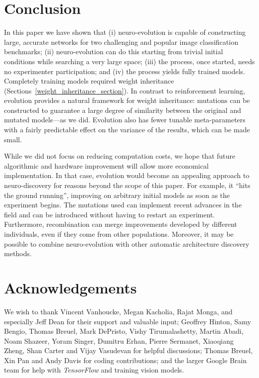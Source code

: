 \documentclass{article}
\begin{document}
\section{Conclusion}


In this paper we have shown that (i) neuro-evolution is capable of constructing large, accurate networks for two challenging and popular image classification benchmarks; (ii) neuro-evolution can do this starting from trivial initial conditions while searching a very large space; (iii) the process, once started, needs no experimenter participation; and (iv) the process yields fully trained models. Completely training models required weight inheritance (Sections~\ref{weight_inheritance_section}). In contrast to reinforcement learning, evolution provides a natural framework for weight inheritance: mutations can be constructed to guarantee a large degree of similarity between the original and mutated models---as we did. Evolution also has fewer tunable meta-parameters with a fairly predictable effect on the variance of the results, which can be made small.

While we did not focus on reducing computation costs, we hope that future algorithmic and hardware improvement will allow more economical implementation. In that case, evolution would become an appealing approach to neuro-discovery for reasons beyond the scope of this paper. For example, it ``hits the ground running'', improving on arbitrary initial models as soon as the experiment begins. The mutations used can implement recent advances in the field and can be introduced without having to restart an experiment. Furthermore, recombination can merge improvements developed by different individuals, even if they come from other populations. Moreover, it may be possible to combine neuro-evolution with other automatic architecture discovery methods.


\FloatBarrier

\section*{Acknowledgements} 
We wish to thank Vincent Vanhoucke, Megan Kacholia, Rajat Monga, and especially Jeff Dean for their support and valuable input; Geoffrey Hinton, Samy Bengio, Thomas Breuel, Mark DePristo, Vishy Tirumalashetty, Martin Abadi, Noam Shazeer, Yoram Singer, Dumitru Erhan, Pierre Sermanet, Xiaoqiang Zheng, Shan Carter and Vijay Vasudevan for helpful discussions; Thomas Breuel, Xin Pan and Andy Davis for coding contributions; and the larger Google Brain team for help with {\em TensorFlow} and training vision models.
\end{document}
